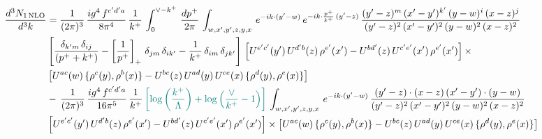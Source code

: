 \documentclass[9pt]{article}
\numberwithin{equation}{section}
\begin{document}
\begin{align}
     \frac{d^{3}N_{1\,\rm NLO}}{d^{3}k} & = \frac{1}{(2\pi)^{3}}\, \frac{ig^{4}\,f^{c'd'a}}{8\pi^{4}}\, \frac{1}{k^{+}}\,\int_{0}^{\vee-k^{+}}\,  \frac{dp^{+}}{2\pi}\, \int_{w,x',y',z,y,x}\, e^{-ik\cdot (y'-w)}\, e^{-ik\cdot \frac{p^{+}}{k^{+}}\,(y'-z)}\,\frac{(y'-z)^{m}\,(x'-y')^{k'}\,(y-w)^{i}\,(x-z)^{j}}{(y'-z)^{2}\,(x'-y')^{2}\,(y-w)^{2}\,(x-z)^{2}}\notag \\ & \left[\frac{\delta_{k'm}\,\delta_{ij}}{(p^{+}+k^{+})}-\left[\frac{1}{p^{+}}\right]_{+}\,\delta_{jm}\,\delta_{ik'}-\frac{1}{k^{+}}\, \delta_{im}\, \delta_{jk'}\right]\, \left[U^{e'c'}(y')\,U^{d'b}(z)\,\rho^{e'}(x')-U^{bd'}(z)\,U^{c'e'}(x')\,\rho^{e'}(x')\right]\times\notag \\ &  \left[U^{ac}(w)\, \{\rho^{c}(y),\rho^{b}(x)\}-U^{bc}(z)\,U^{ad}(y)\,U^{ce}(x)\,\{\rho^{d}(y),\rho^{e}(x)\}\right]\notag \\ & -\,\frac{1}{(2\pi)^{3}}\, \frac{ig^{4}\,f^{c'd'a}}{16\pi^{5}}\, \frac{1}{k^{+}}\,{\color{teal}\left[\log{\left(\frac{k^{+}}{\Lambda}\right)}+\log{\left(\frac{\vee}{k^{+}}-1\right)}\right]}\, \int_{w,x',y',z,y,x}\, e^{-ik\cdot (y'-w)}\,\frac{(y'-z)\cdot (x-z)\,(x'-y')\cdot (y-w)}{(y'-z)^{2}\,(x'-y')^{2}\,(y-w)^{2}\,(x-z)^{2}}\notag \\ &  \left[U^{e'c'}(y')\,U^{d'b}(z)\,\rho^{e'}(x')-U^{bd'}(z)\,U^{c'e'}(x')\,\rho^{e'}(x')\right]\times  \left[U^{ac}(w)\, \{\rho^{c}(y),\rho^{b}(x)\}-U^{bc}(z)\,U^{ad}(y)\,U^{ce}(x)\,\{\rho^{d}(y),\rho^{e}(x)\}\right]
\end{align} 
\end{document}
